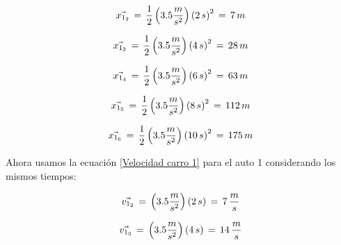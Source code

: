 \documentclass[letterpaper, 12pt]{article}
\begin{document}
\begin{enumerate}
\begin{enumerate}
            \begin{equation}
                \label{1p2}
                \vec{x_{1_{2}}} \thinspace = \thinspace \frac{1}{2} \left( 3.5 \frac{m}{s^{2}} \right) \left( 2 \thinspace s \right)^{2} \thinspace = \thinspace 7 \thinspace m
            \end{equation}
            
            \begin{equation}
                \label{1p3}
                \vec{x_{1_{3}}} \thinspace = \thinspace \frac{1}{2} \left( 3.5 \frac{m}{s^{2}} \right) \left( 4 \thinspace s \right)^{2} \thinspace = \thinspace 28 \thinspace m
            \end{equation}
            
            \begin{equation}
                \label{1p4}
                \vec{x_{1_{4}}} \thinspace = \thinspace \frac{1}{2} \left( 3.5 \frac{m}{s^{2}} \right) \left( 6 \thinspace s \right)^{2} \thinspace = \thinspace 63 \thinspace m
            \end{equation}
            
            \begin{equation}
                \label{1p5}
                \vec{x_{1_{5}}} \thinspace = \thinspace \frac{1}{2} \left( 3.5 \frac{m}{s^{2}} \right) \left( 8 \thinspace s \right)^{2} \thinspace = \thinspace 112 \thinspace m
            \end{equation}
            
            \begin{equation}
                \label{1p6}
                \vec{x_{1_{6}}} \thinspace = \thinspace \frac{1}{2} \left( 3.5 \frac{m}{s^{2}} \right) \left( 10 \thinspace s \right)^{2} \thinspace = \thinspace 175 \thinspace m
            \end{equation}
            
            Ahora usamos la ecuación \ref{Velocidad carro 1} para el auto 1 considerando los mismos tiempos: 
            
            \begin{equation}
                \label{1v2}
                \vec{v_{1_{2}}} \thinspace = \thinspace \left( 3.5 \frac{m}{s^{2}} \right) \left( 2 \thinspace s \right) \thinspace = \thinspace 7 \thinspace \frac{m}{s}
            \end{equation}
            
            \begin{equation}
                \label{1v3}
                \vec{v_{1_{3}}} \thinspace = \thinspace \left( 3.5 \frac{m}{s^{2}} \right) \left( 4 \thinspace s \right) \thinspace = \thinspace 14 \thinspace \frac{m}{s}
            \end{equation}
            

\end{enumerate}
\end{enumerate}
\end{document}
